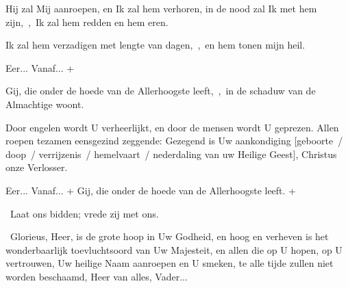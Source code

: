 \documentclass[12pt,twoside,a5paper]{article}
\begin{document}
\begin{halfparskip}
  Hij zal Mij aanroepen, en Ik zal hem verhoren, in de nood zal Ik met hem zijn,~\sep\ Ik zal hem redden en hem eren.

  Ik zal hem verzadigen met lengte van dagen,~\sep\ en hem tonen mijn heil.

  \begin{exceptionalexception}
      

    Eer... Vanaf... + 

     Gij, die onder de hoede van de Allerhoogste leeft,~\sep\ in de schaduw van de Almachtige woont.

     Door engelen wordt U verheerlijkt, en door de mensen wordt U geprezen. Allen roepen tezamen eensgezind zeggende: Gezegend is Uw aankondiging [geboorte~/ doop~/ verrijzenis~/ hemelvaart~/ nederdaling van uw Heilige Geest], Christus onze Verlosser.
  \end{exceptionalexception}

   Eer... Vanaf... +  Gij, die onder de hoede van de Allerhoogste leeft. + 
\end{halfparskip}

\begin{halfparskip}
  \dd~Laat ons bidden; vrede zij met ons.

  \cc~Glorieus, Heer, is de grote hoop in Uw Godheid, en hoog en verheven is het wonderbaarlijk toevluchtsoord van Uw Majesteit, en allen die op U hopen, op U vertrouwen, Uw heilige Naam aanroepen en U smeken, te alle tijde zullen niet worden beschaamd, Heer van alles, Vader...
\end{halfparskip}
\end{document}
